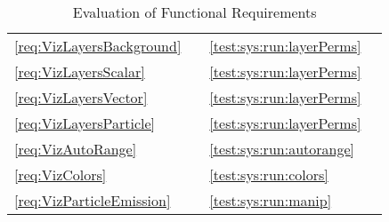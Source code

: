 \begin{table}[p]
\begin{tabular}{l|c|l|c}
        \ref{req:VizLayersBackground}  & \must{} & \ref{test:sys:run:layerPerms} & \testsuccess{}  \\
        \ref{req:VizLayersScalar}  & \must{} & \ref{test:sys:run:layerPerms} & \testsuccess{}      \\
        \ref{req:VizLayersVector}  & \must{} & \ref{test:sys:run:layerPerms} & \testsuccess{}      \\
        \ref{req:VizLayersParticle}  & \must{} & \ref{test:sys:run:layerPerms} & \testsuccess{}       \\
        \hline
        \ref{req:VizAutoRange} & \should{} & \ref{test:sys:run:autorange} & \testsuccess{}     \\
        \ref{req:VizColors} & \should{} & \ref{test:sys:run:colors}  & \testsuccess{}    \\
        \ref{req:VizParticleEmission} & \should{} & \ref{test:sys:run:manip} & \testsuccess{} \\
    \end{tabular}
    \caption{Evaluation of Functional Requirements}
    \label{tab:req_matrix_f}
\end{table}

